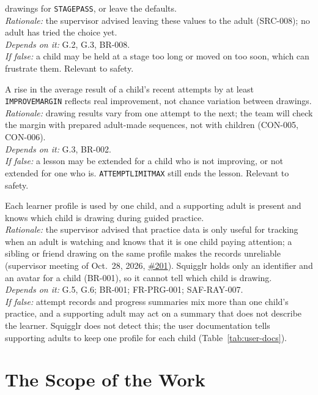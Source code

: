 \documentclass[12pt]{article}
\renewcommand{\_}{\textunderscore\allowbreak}%
\begin{document}
\begin{description}[style=nextline]
drawings for \texttt{STAGE\_PASS}, or leave the defaults.\\
\emph{Rationale:} the supervisor advised leaving these values to the adult
(SRC-008); no adult has tried the choice yet.\\
\emph{Depends on it:} G.2, G.3, BR-008.\\
\emph{If false:} a child may be held at a stage too long or moved on too soon,
which can frustrate them. Relevant to safety.
\item[ASM-017] A rise in the average result of a child's recent attempts by at
least \texttt{IMPROVE\_MARGIN} reflects real improvement, not chance variation
between drawings.\\
\emph{Rationale:} drawing results vary from one attempt to the next; the team
will check the margin with prepared adult-made sequences, not with children
(CON-005, CON-006).\\
\emph{Depends on it:} G.3, BR-002.\\
\emph{If false:} a lesson may be extended for a child who is not improving, or
not extended for one who is. \texttt{ATTEMPT\_LIMIT\_MAX} still ends the lesson.
Relevant to safety.
\item[ASM-018] Each learner profile is used by one child, and a supporting adult
is present and knows which child is drawing during guided practice.\\
\emph{Rationale:} the supervisor advised that practice data is only useful for
tracking when an adult is watching and knows that it is one child paying
attention; a sibling or friend drawing on the same profile makes the records
unreliable (supervisor meeting of Oct.~28, 2026,
\href{https://github.com/AHMEDELZARIA/squigglr/issues/201}{\#201}). Squigglr
holds only an identifier and an avatar for a child (BR-001), so it cannot tell
which child is drawing.\\
\emph{Depends on it:} G.5, G.6; BR-001; FR-PRG-001; SAF-RAY-007.\\
\emph{If false:} attempt records and progress summaries mix more than one
child's practice, and a supporting adult may act on a summary that does not
describe the learner. Squigglr does not detect this; the user documentation
tells supporting adults to keep one profile for each child
(Table~\ref{tab:user-docs}).
\end{description}

\section{The Scope of the Work}
\label{sec:work-scope}
\end{document}
